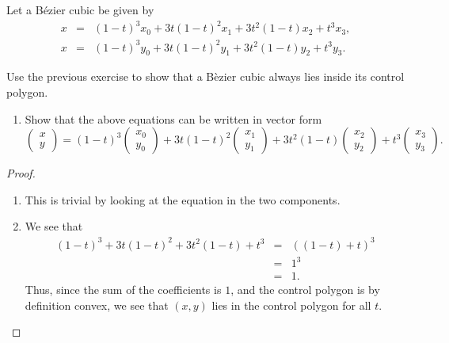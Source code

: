 \begin{exercise}{15}
    Let a B\'ezier cubic be given by
    \begin{eqnarray*}
        x & = & (1-t)^3 x_0 + 3t(1-t)^2 x_1 + 3t^2 (1-t) x_2 + t^3 x_3,\\
        x & = & (1-t)^3 y_0 + 3t(1-t)^2 y_1 + 3t^2 (1-t) y_2 + t^3 y_3.        
    \end{eqnarray*}
    \item Use the previous exercise to show that a B\`ezier cubic always lies inside its control polygon.
    \begin{enumerate}
        \item Show that the above equations can be written in vector form
        $$\left(\begin{array}{c} x\\ y\end{array}\right) = (1-t)^3 \left(\begin{array}{c} x_0\\ y_0\end{array}\right) + 3t(1-t)^2\left(\begin{array}{c} x_1\\ y_1\end{array}\right) + 3t^2 (1-t) \left(\begin{array}{c} x_2\\ y_2\end{array}\right) + t^3 \left(\begin{array}{c} x_3\\ y_3\end{array}\right).$$
    \end{enumerate}
\end{exercise}
\begin{proof}
    \begin{enumerate}
        \item This is trivial by looking at the equation in the two components. 
        \item We see that
        \begin{eqnarray*}
            (1-t)^3 + 3t(1-t)^2 + 3t^2 (1-t) + t^3
            & = & ( (1-t) + t)^3\\
            & = & 1^3\\
            & = & 1.
        \end{eqnarray*}
        Thus, since the sum of the coefficients is $1$, and the control polygon is by definition convex, we see that $(x,y)$ lies in the control polygon for all $t$.
    \end{enumerate}
\end{proof}

